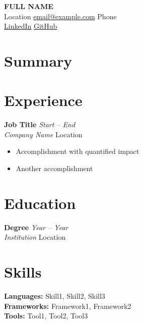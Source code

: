 \documentclass[11pt,a4paper]{article}
\begin{document}
\begin{center}
    {\LARGE\bfseries FULL NAME} \\[4pt]
    Location \quad\textbar\quad
    \href{mailto:email@example.com}{email@example.com} \quad\textbar\quad
    Phone \\[2pt]
    \href{https://linkedin.com/in/username}{LinkedIn} \quad\textbar\quad
    \href{https://github.com/username}{GitHub}
\end{center}

\section{Summary}

\section{Experience}

\textbf{Job Title} \hfill \textit{Start -- End} \\
\textit{Company Name} \hfill Location
\begin{itemize}
    \item Accomplishment with quantified impact
    \item Another accomplishment
\end{itemize}

\vspace{4pt}


\section{Education}

\textbf{Degree} \hfill \textit{Year -- Year} \\
\textit{Institution} \hfill Location

\section{Skills}
\textbf{Languages:} Skill1, Skill2, Skill3 \\
\textbf{Frameworks:} Framework1, Framework2 \\
\textbf{Tools:} Tool1, Tool2, Tool3
\end{document}
